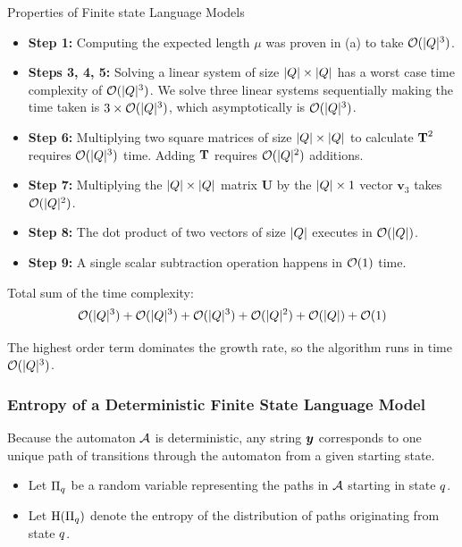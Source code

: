 \begin{question}{Properties of Finite state Language Models}
\begin{subquestion}
\begin{itemize}
    \item \textbf{Step 1:} Computing the expected length $\mu$ was proven in (a) to take $\bigo(|\states|^3)$.
    \item \textbf{Steps 3, 4, 5:} Solving a linear system of size $|\states| \times |\states|$ has a worst case time complexity of $\bigo(|\states|^3)$. We solve three linear systems sequentially making the time taken is $3 \times \bigo(|\states|^3)$, which asymptotically is $\bigo(|\states|^3)$.
    \item \textbf{Step 6:} Multiplying two square matrices of size $|\states| \times |\states|$ to calculate $\transMtx^2$ requires $\bigo(|\states|^3)$ time. Adding $\transMtx$ requires $\bigo(|\states|^2)$ additions.
    \item \textbf{Step 7:} Multiplying the $|\states| \times |\states|$ matrix $\mathbf{U}$ by the $|\states| \times 1$ vector $\mathbf{v}_3$ takes $\bigo(|\states|^2)$.
    \item \textbf{Step 8:} The dot product of two vectors of size $|\states|$ executes in $\bigo(|\states|)$.
    \item \textbf{Step 9:} A single scalar subtraction operation happens in $\bigo(1)$ time.
\end{itemize}

Total sum of the time complexity:
\begin{equation}
    \bigo(|\states|^3) + \bigo(|\states|^3) + \bigo(|\states|^3) + \bigo(|\states|^2) + \bigo(|\states|) + \bigo(1)
\end{equation}

The highest order term dominates the growth rate, so the algorithm runs in time $\bigo(|\states|^3)$.

\end{subquestion}

\begin{subquestion}

\subsubsection*{Entropy of a Deterministic Finite State Language Model}

Because the automaton $\automaton$ is deterministic, any string $\str$ corresponds to one unique path of transitions through the automaton from a given starting state.
\begin{itemize}
    \item Let $\Pi_\stateq$ be a random variable representing the paths in $\automaton$ starting in state $\stateq$.
    \item Let $\ent(\Pi_\stateq)$ denote the entropy of the distribution of paths originating from state $\stateq$.
\end{itemize}


\end{subquestion}
\end{question}
